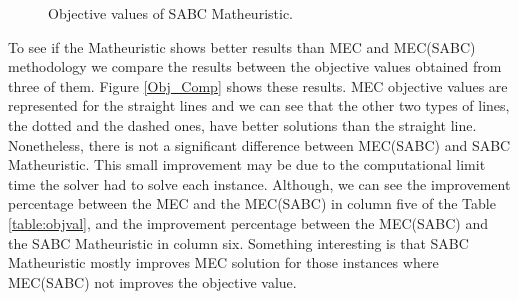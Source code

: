 \begin{figure}[H]
\hspace{0.4cm}%
\vspace{0.4cm}
\caption{Objective values of SABC Matheuristic.}
\label{Obj_Math}
\end{figure}


To see if the Matheuristic shows better results than MEC and MEC(SABC) methodology we compare the results between the objective values obtained from three of them. Figure \ref{Obj_Comp} shows these results. MEC objective values are represented for the straight lines and we can see that the other two types of lines, the dotted and the dashed ones, have better solutions than the straight line. Nonetheless, there is not a significant difference between MEC(SABC) and SABC Matheuristic. This small improvement may be due to the computational limit time the solver had to solve each instance. Although, we can see the improvement percentage between the MEC and the MEC(SABC) in column five of the Table \ref{table:objval}, and the improvement percentage between the MEC(SABC) and the SABC Matheuristic in column six. Something interesting is that SABC Matheuristic mostly improves MEC solution for those instances where MEC(SABC) not improves the objective value.


